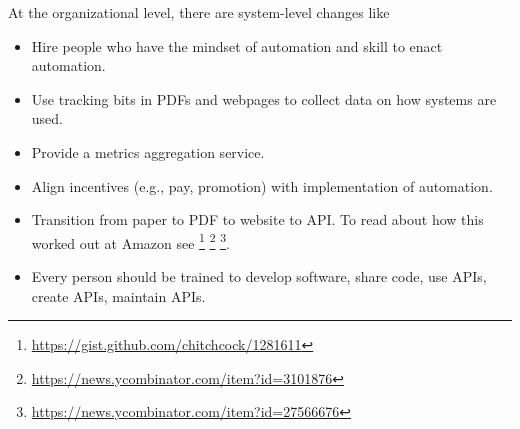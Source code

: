 At the organizational level, there are system-level changes like
\begin{itemize}
    \item Hire people who have the mindset of automation and skill to enact automation.
    \item Use tracking bits in PDFs and webpages to collect data on how systems are used.
    \item Provide a metrics aggregation service.
    \item Align incentives (e.g., pay, promotion) with implementation of automation.
    \item Transition from paper to PDF to website to API. To read about how this worked out at Amazon see \footnote{\href{https://gist.github.com/chitchcock/1281611}{https://gist.github.com/chitchcock/1281611}}
    \footnote{\href{https://news.ycombinator.com/item?id=3101876}{https://news.ycombinator.com/item?id=3101876}}
    \footnote{\href{https://news.ycombinator.com/item?id=27566676}{https://news.ycombinator.com/item?id=27566676}}.
    \item Every person should be trained to develop software, share code, use APIs, create APIs, maintain APIs.
\end{itemize}
